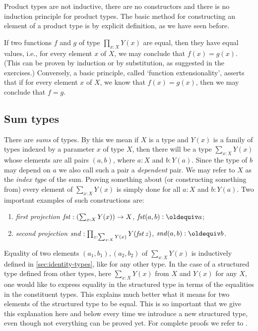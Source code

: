 Product types are not inductive, there are no constructors and
there is no induction principle for product types. 
The basic method for constructing an element of a product type
is by explicit definition, as we have seen before.

If two functions $f$ and $g$ of type $\prod_{x:X} Y(x)$ are equal, then they have equal values, i.e., for every element $x$ of $X$, we may
conclude that $f(x) = g(x)$.  (This can be proven by induction or by substitution, as suggested in the exercises.)  Conversely, a basic
principle, called `function extensionality', asserts that if for every element $x$ of $X$, we know that $f(x) = g(x)$, then we may conclude that
$f=g$.

\subsection{Sum types}
\label{sec:sum-types}
There are \emph{sums} of types.  By this we mean if $X$ is a type and $Y(x)$ is a family of types indexed by a parameter $x$ of type $X$, then
there will be a type $\sum _{x:X} Y(x)$ whose elements are all pairs $(a,b)$, where $a:X$ and $b:Y(a)$. Since the type of $b$ may depend on $a$ we also call such a pair
a \emph{dependent} pair. We may refer to $X$ as the \emph{index
  type} of the sum.  Proving something about (or constructing something from) every element of $\sum _{x:X} Y(x)$ is simply done for all $a:X$ and $b: Y(a)$.
Two important examples of such constructions are:
\begin{enumerate}
\item \emph{first projection} $\mathop{\mathit{fst}}:(\sum _{x:X} Y(x)) \to X$, 
$\fst(a,b)\defeq a$;
\item \emph{second projection}
$\mathop{\mathit{snd}}: \prod_{z: \sum _{x:X} Y(x)} Y(\mathop{\mathit{fst}} z)$, $\snd(a,b)\defeq b$.
\end{enumerate}

Equality of two elements $(a_1,b_1),(a_2,b_2)$ of $\sum _{x:X} Y(x)$ is 
inductively defined in \cref{sec:identity-types}, like for any other type.
In the case of a structured type defined from other types, 
here $\sum _{x:X} Y(x)$ from $X$ and $Y(x)$ for any $X$,
one would like to express equality in the structured type in terms of 
the equalities in the constituent types. This explains much better
what it means for two elements of the structured type to be equal.
This is so important that we give this explanation here and below
every time we introduce a new structured type, even though not everything
can be proved yet. For complete proofs we refer to \cite{hottbook}.

